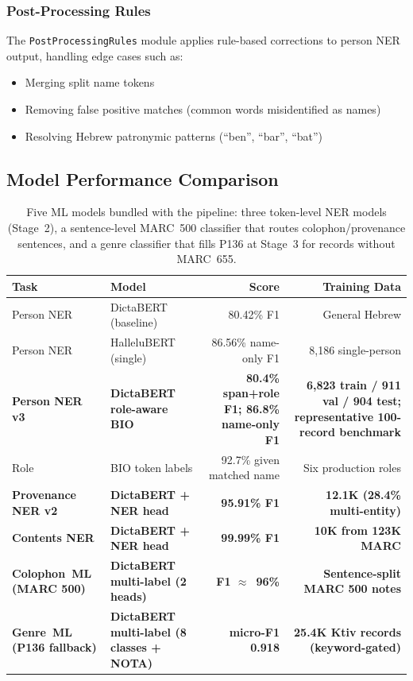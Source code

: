 \documentclass[12pt]{article}
\newcommand{\code}[1]{\texttt{#1}}
\begin{document}
\subsubsection{Post-Processing Rules}

The \code{PostProcessingRules} module applies rule-based corrections to person NER output, handling edge cases such as:
\begin{itemize}
\item Merging split name tokens
\item Removing false positive matches (common words misidentified as names)
\item Resolving Hebrew patronymic patterns (``ben'', ``bar'', ``bat'')
\end{itemize}

\subsection{Model Performance Comparison}

\begin{table}[H]
\centering
\begin{tabular}{llrr}
\toprule
\textbf{Task} & \textbf{Model} & \textbf{Score} & \textbf{Training Data} \\
\midrule
Person NER & DictaBERT (baseline) & 80.42\% F1 & General Hebrew \\
Person NER & HalleluBERT (single) & 86.56\% name-only F1 & 8,186 single-person \\
\textbf{Person NER v3} & \textbf{DictaBERT role-aware BIO} & \textbf{80.4\% span+role F1; 86.8\% name-only F1} & \textbf{6,823 train / 911 val / 904 test; representative 100-record benchmark} \\
\midrule
Role & BIO token labels & 92.7\% given matched name & Six production roles \\
\midrule
\textbf{Provenance NER v2} & \textbf{DictaBERT + NER head} & \textbf{95.91\% F1} & \textbf{12.1K (28.4\% multi-entity)} \\
\textbf{Contents NER} & \textbf{DictaBERT + NER head} & \textbf{99.99\% F1} & \textbf{10K from 123K MARC} \\
\midrule
\textbf{Colophon~ML (MARC 500)} & \textbf{DictaBERT multi-label (2 heads)} & \textbf{F1 $\approx$~96\%} & \textbf{Sentence-split MARC 500 notes} \\
\textbf{Genre~ML (P136 fallback)} & \textbf{DictaBERT multi-label (8 classes + NOTA)} & \textbf{micro-F1 0.918} & \textbf{25.4K Ktiv records (keyword-gated)} \\
\bottomrule
\end{tabular}
\caption{Five ML models bundled with the pipeline: three token-level NER models (Stage~2), a sentence-level MARC~500 classifier that routes colophon/provenance sentences, and a genre classifier that fills P136 at Stage~3 for records without MARC~655.}
\label{tab:ner-models}
\end{table}
\end{document}
